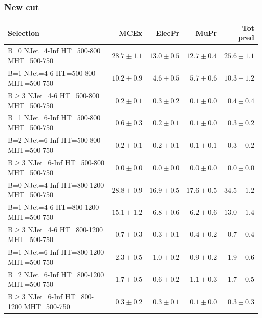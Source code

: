 \documentclass{beamer}
\begin{document}
\begin{frame}
\frametitle{New \mindeltaphi cut}
\tiny
 \begin{tabular}{lrrrr}
\toprule
                                       Selection  &                     MCEx  &           ElecPr  &             MuPr  &          Tot pred  \\ 
\midrule
    B=0 NJet=4-Inf HT=500-800 MHT=500-750 &              $28.7\pm1.1$&              $13.0\pm0.5$&              $12.7\pm0.4$&                  $25.6\pm1.1$ \\ 
      B=1 NJet=4-6 HT=500-800 MHT=500-750 &              $10.2\pm0.9$&               $4.6\pm0.5$&               $5.7\pm0.6$&                  $10.3\pm1.2$ \\ 
      $\text{B}\geq3$ NJet=4-6 HT=500-800 MHT=500-750 &               $0.2\pm0.1$&               $0.3\pm0.2$&               $0.1\pm0.0$&                   $0.4\pm0.4$ \\ 
    B=1 NJet=6-Inf HT=500-800 MHT=500-750 &               $0.6\pm0.3$&               $0.2\pm0.1$&               $0.1\pm0.0$&                   $0.3\pm0.2$ \\ 
    B=2 NJet=6-Inf HT=500-800 MHT=500-750 &               $0.2\pm0.1$&               $0.2\pm0.1$&               $0.1\pm0.1$&                   $0.3\pm0.2$ \\ 
    $\text{B}\geq3$ NJet=6-Inf HT=500-800 MHT=500-750 &               $0.0\pm0.0$&               $0.0\pm0.0$&               $0.0\pm0.0$&                   $0.0\pm0.0$ \\ 
   B=0 NJet=4-Inf HT=800-1200 MHT=500-750 &              $28.8\pm0.9$&              $16.9\pm0.5$&              $17.6\pm0.5$&                  $34.5\pm1.2$ \\ 
     B=1 NJet=4-6 HT=800-1200 MHT=500-750 &              $15.1\pm1.2$&               $6.8\pm0.6$&               $6.2\pm0.6$&                  $13.0\pm1.4$ \\ 
     $\text{B}\geq3$ NJet=4-6 HT=800-1200 MHT=500-750 &               $0.7\pm0.3$&               $0.3\pm0.1$&               $0.4\pm0.2$&                   $0.7\pm0.4$ \\ 
   B=1 NJet=6-Inf HT=800-1200 MHT=500-750 &               $2.3\pm0.5$&               $1.0\pm0.2$&               $0.9\pm0.2$&                   $1.9\pm0.6$ \\ 
   B=2 NJet=6-Inf HT=800-1200 MHT=500-750 &               $1.7\pm0.5$&               $0.6\pm0.2$&               $1.1\pm0.3$&                   $1.7\pm0.5$ \\ 
   $\text{B}\geq3$ NJet=6-Inf HT=800-1200 MHT=500-750 &               $0.3\pm0.2$&               $0.3\pm0.1$&               $0.1\pm0.0$&                   $0.3\pm0.3$ \\ 

\end{tabular}
\end{frame}
\end{document}
